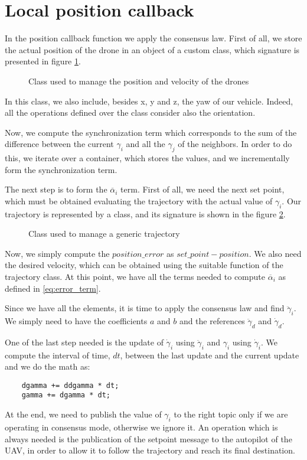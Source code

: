 \section{Local position callback\label{sec:local_position_callback}}

In the position callback function we apply the consensus law. First of all, we
store the actual position of the drone in an object of a custom class,
which signature is presented in figure \ref{fig:drone_pose}.
\begin{figure}
\centering
  
\caption{Class used to manage the position and velocity of the drones}
\label{fig:drone_pose}
\end{figure}
In this class, we also include, besides x, y and z, the yaw of our vehicle. Indeed,
all the operations defined over the class consider also the orientation.

Now, we compute the synchronization term which corresponds to the sum of the
difference between the current $\gamma_i$ and all the $\gamma_j$ of the neighbors.
In order to do this, we iterate over a container, which stores the values, and
we incrementally form the synchronization term.

The next step is to form the $\overline{\alpha}_i$ term.
First of all, we need the next set point, which must be obtained evaluating
the trajectory with the actual value of $\gamma_i$.
Our trajectory is represented by a class, and its signature is shown in the figure
\ref{fig:loc_pos_callback_trajectory}.
\begin{figure}
\centering
  
\caption{Class used to manage a generic trajectory}
\label{fig:loc_pos_callback_trajectory}
\end{figure}
Now, we simply compute the $position\_error$ as $set\_point - position$.
We also need the desired velocity, which can be obtained using the suitable function
of the trajectory class.
At this point, we have all the terms needed to compute $\overline{\alpha}_i$
as defined in \ref{eq:error_term}.

Since we have all the elements, it is time to apply the consensus law and find
$\ddot{\gamma}_i$. We simply need to have the coefficients $a$ and $b$
and the references $\ddot{\gamma}_d$ and $\dot{\gamma}_d$.

One of the last step needed is the update of $\dot{\gamma}_i$ using $\ddot{\gamma}_i$
and $\gamma_i$ using $\dot{\gamma}_i$. We compute the interval of time, $dt$, between the
last update and the current update and we do the math as:
\begin{lstlisting}
    dgamma += ddgamma * dt;
    gamma += dgamma * dt;
\end{lstlisting}

At the end, we need to publish the value of $\gamma_i$ to the right topic only
if we are operating in consensus mode, otherwise we ignore it. An operation which is
always needed is the publication of the setpoint message to the autopilot of
the UAV, in order to allow it to follow the trajectory and reach its final destination.
